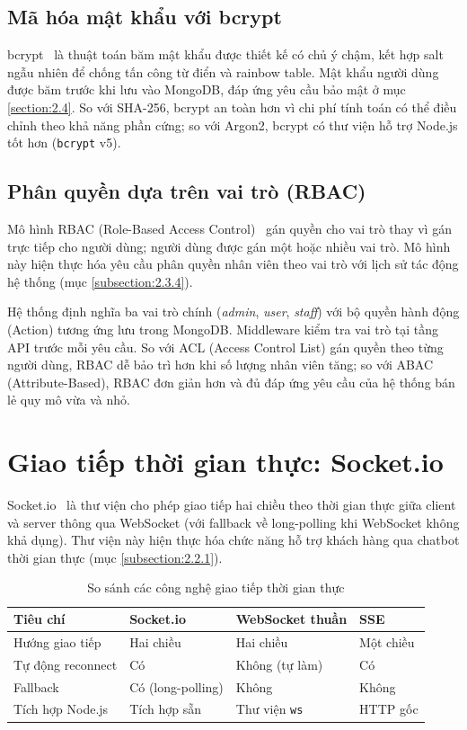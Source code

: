\documentclass[../DoAn.tex]{subfiles}
\begin{document}
\subsection{Mã hóa mật khẩu với bcrypt}
\label{subsection:3.5.2}

bcrypt~\cite{provos1999} là thuật toán băm mật khẩu được thiết kế có chủ ý chậm,
kết hợp salt ngẫu nhiên để chống tấn công từ điển và rainbow table. Mật khẩu
người dùng được băm trước khi lưu vào MongoDB, đáp ứng yêu cầu bảo mật ở mục
\ref{section:2.4}. So với SHA-256, bcrypt an toàn hơn vì chi phí tính toán có thể
điều chỉnh theo khả năng phần cứng; so với Argon2, bcrypt có thư viện hỗ trợ
Node.js tốt hơn \break (\texttt{bcrypt} v5).

\subsection{Phân quyền dựa trên vai trò (RBAC)}
\label{subsection:3.5.3}

Mô hình RBAC (Role-Based Access Control)~\cite{sandhu1996} gán quyền cho vai trò
thay vì gán trực tiếp cho người dùng; người dùng được gán một hoặc nhiều vai trò.
Mô hình này hiện thực hóa yêu cầu phân quyền nhân viên theo vai trò với lịch sử tác động hệ thống (mục \ref{subsection:2.3.4}).

Hệ thống định nghĩa ba vai trò chính (\textit{admin}, \textit{user},
\textit{staff}) với bộ quyền hành động (Action) tương ứng lưu trong MongoDB.
Middleware kiểm tra vai trò tại tầng API trước mỗi yêu cầu. So với ACL (Access
Control List) gán quyền theo từng người dùng, RBAC dễ bảo trì hơn khi số lượng
nhân viên tăng; so với ABAC (Attribute-Based), RBAC đơn giản hơn và đủ đáp ứng
yêu cầu của hệ thống bán lẻ quy mô vừa và nhỏ.

\section{Giao tiếp thời gian thực: Socket.io}
\label{section:3.6}

Socket.io~\cite{socketio} là thư viện cho phép giao tiếp hai chiều theo thời gian
thực giữa client và server thông qua \break WebSocket (với fallback về long-polling khi
WebSocket không khả dụng). Thư viện này hiện thực hóa chức năng hỗ trợ khách hàng
qua chatbot thời gian thực (mục \ref{subsection:2.2.1}).

\begin{table}[H]
\centering
\caption{So sánh các công nghệ giao tiếp thời gian thực}
\label{tab:realtime}
\begin{tabular}{|p{3.5cm}|p{3cm}|p{3cm}|p{3cm}|}
\hline
\textbf{Tiêu chí} & \textbf{Socket.io} & \textbf{WebSocket thuần} & \textbf{SSE} \\
\hline
Hướng giao tiếp & Hai chiều & Hai chiều & Một chiều \\
\hline
Tự động reconnect & Có & Không (tự làm) & Có \\
\hline
Fallback & Có \break (long-polling) & Không & Không \\
\hline
Tích hợp Node.js & Tích hợp sẵn & Thư viện \texttt{ws} & HTTP gốc \\
\hline
\end{tabular}
\end{table}
\end{document}

